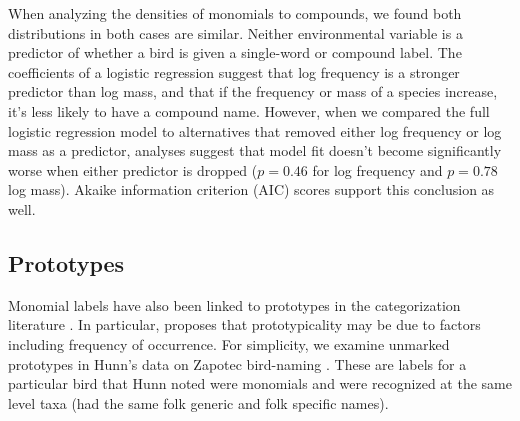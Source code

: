 \documentclass[10pt,letterpaper]{article}
\begin{document}


When analyzing the densities of monomials to compounds, we found both distributions in both cases are similar. Neither environmental variable is a predictor of whether a bird is given a single-word or compound label. The coefficients of a logistic regression suggest that log frequency is a stronger predictor than log mass, and that if the frequency or mass of a species increase, it’s less likely to have a compound name. However, when we compared the full logistic regression model to alternatives that removed either log frequency or log mass as a predictor, analyses suggest that model fit doesn’t become significantly worse when either predictor is dropped ($p=0.46$ for log frequency and $p=0.78$ log mass).  Akaike information criterion (AIC) scores support this conclusion as well. 

\subsection{Prototypes}

Monomial labels have also been linked to prototypes in the categorization literature \cite{berlin1972speculations,berlin2014ethnobiological}. In particular,  proposes that prototypicality may be due to factors including frequency of occurrence. For simplicity, we examine unmarked prototypes in Hunn's data on Zapotec bird-naming  \cite{hunn2008zapotec}. These are labels for a particular bird that Hunn noted were monomials and were recognized at the same level taxa (had the same folk generic and folk specific names). 
\end{document}
